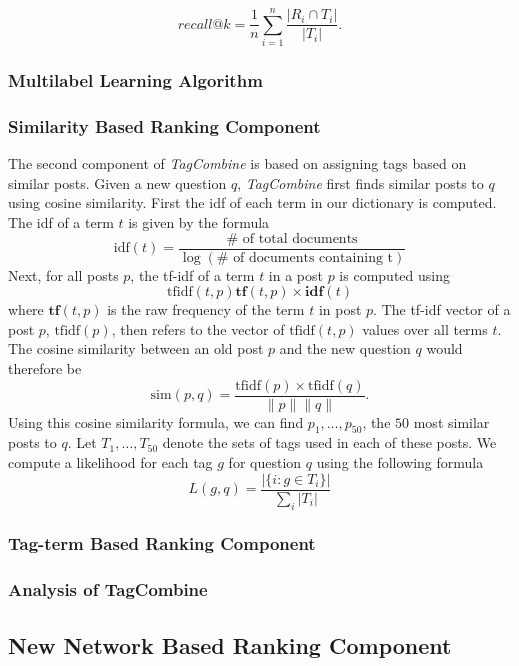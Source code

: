 \documentclass[11pt]{IEEEtran}
\begin{document}
\[recall@k = \frac{1}{n}\sum\limits_{i=1}^{n}\frac{|R_i \cap T_i|}{|T_i|}.\]

\subsubsection{Multilabel Learning Algorithm}

\subsubsection{Similarity Based Ranking Component}

The second component of \textit{TagCombine} is based on assigning tags based on similar posts. Given a new question $q$, \textit{TagCombine} first finds similar posts to $q$ using cosine similarity. First the idf of each term in our dictionary is computed. The idf of a term $t$ is given by the formula
\[ \text{idf}(t) = \frac{\# \text{ of total documents}}{\log (\# \text{ of documents containing t} )} \]
Next, for all posts $p$, the tf-idf of a term $t$ in a post $p$ is computed using
\[ \text{tfidf}(t,p) \mathbf{tf}(t, p) \times \mathbf{idf}(t)\]
where $\mathbf{tf}(t, p)$ is the raw frequency of the term $t$ in post $p$. The tf-idf vector of a post $p$, $\text{tfidf}(p)$, then refers to the vector of $\text{tfidf}(t,p)$ values over all terms $t$. The cosine similarity between an old post $p$ and the new question $q$ would therefore be
\[ \text{sim}(p, q) = \frac{\text{tfidf}(p) \times \text{tfidf}(q)}{\|p\| \|q\|}.\]
Using this cosine similarity formula, we can find $p_1, \ldots, p_{50}$, the $50$ most similar posts to $q$. Let $T_1, \ldots, T_{50}$ denote the sets of tags used in each of these posts. We compute a likelihood for each tag $g$ for question $q$ using the following formula
\[ L(g, q) = \frac{ |\{i : g \in T_i \} | }{\sum_i  |T_i |}\]


\subsubsection{Tag-term Based Ranking Component}

\subsubsection{Analysis of TagCombine}

\subsection{New Network Based Ranking Component}
\end{document}
